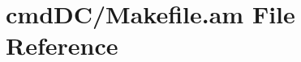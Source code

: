 \hypertarget{cmd_d_c_2_makefile_8am}{\section{cmd\+D\+C/\+Makefile.am File Reference}
\label{cmd_d_c_2_makefile_8am}
}
